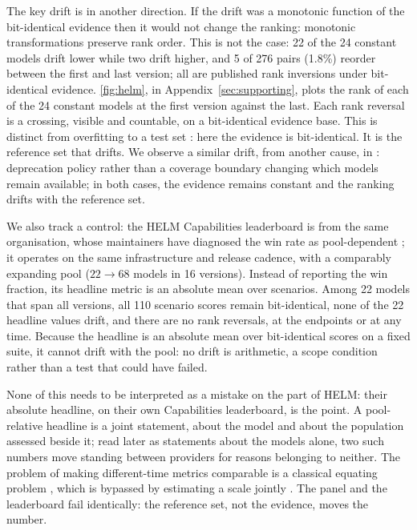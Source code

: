 \documentclass{article}
\begin{document}
The key drift is in another direction. If the drift was a monotonic function of the bit-identical evidence then it would not change the ranking: monotonic transformations preserve rank order. This is not the case: 22 of the 24 constant models drift lower while two drift higher, and 5 of 276 pairs (1.8\%) reorder between the first and last version; all are published rank inversions under bit-identical evidence. \autoref{fig:helm}, in Appendix~\ref{sec:supporting}, plots the rank of each of the 24 constant models at the first version against the last. Each rank reversal is a crossing, visible and countable, on a bit-identical evidence base. This is distinct from overfitting to a test set \citep{roelofs2019meta}: here the evidence is bit-identical. It is the reference set that drifts. We observe a similar drift, from another cause, in \citet{singh2025leaderboard}: deprecation policy rather than a coverage boundary changing which models remain available; in both cases, the evidence remains constant and the ranking drifts with the reference set.

We also track a control: the HELM Capabilities leaderboard is from the same organisation, whose maintainers have diagnosed the win rate as pool-dependent \citep{xu2025capabilities}; it operates on the same infrastructure and release cadence, with a comparably expanding pool ($22 \to 68$ models in 16 versions). Instead of reporting the win fraction, its headline metric is an absolute mean over scenarios. Among 22 models that span all versions, all 110 scenario scores remain bit-identical, none of the 22 headline values drift, and there are no rank reversals, at the endpoints or at any time. Because the headline is an absolute mean over bit-identical scores on a fixed suite, it cannot drift with the pool: no drift is arithmetic, a scope condition rather than a test that could have failed.

None of this needs to be interpreted as a mistake on the part of HELM: their absolute headline, on their own Capabilities leaderboard, is the point. A pool-relative headline is a joint statement, about the model and about the population assessed beside it; read later as statements about the models alone, two such numbers move standing between providers for reasons belonging to neither. The problem of making different-time metrics comparable is a classical equating problem \citep{kolen2014}, which is bypassed by estimating a scale jointly \citep{epoch2026rosetta}. The panel and the leaderboard fail identically: the reference set, not the evidence, moves the number.
\end{document}
